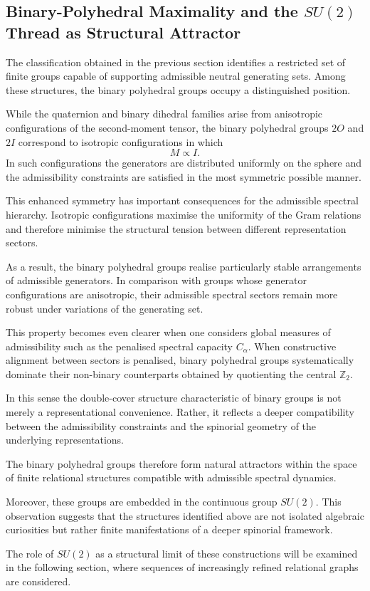 \subsection{Binary-Polyhedral Maximality and the $SU(2)$ Thread as Structural Attractor}
  \label{subsec:binary-polyhedral-maximality}

  The classification obtained in the previous section identifies a restricted
  set of finite groups capable of supporting admissible neutral generating
  sets.
  Among these structures, the binary polyhedral groups occupy a distinguished
  position.

  While the quaternion and binary dihedral families arise from anisotropic
  configurations of the second-moment tensor, the binary polyhedral groups
  $2O$ and $2I$ correspond to isotropic configurations in which
  \[
    M \propto I .
  \]
  In such configurations the generators are distributed uniformly on the
  sphere and the admissibility constraints are satisfied in the most symmetric
  possible manner.

  This enhanced symmetry has important consequences for the admissible
  spectral hierarchy.
  Isotropic configurations maximise the uniformity of the Gram relations and
  therefore minimise the structural tension between different representation
  sectors.

  As a result, the binary polyhedral groups realise particularly stable
  arrangements of admissible generators.
  In comparison with groups whose generator configurations are anisotropic,
  their admissible spectral sectors remain more robust under variations of the
  generating set.

  This property becomes even clearer when one considers global measures of
  admissibility such as the penalised spectral capacity $C_\alpha$.
  When constructive alignment between sectors is penalised, binary polyhedral
  groups systematically dominate their non-binary counterparts obtained by
  quotienting the central $\mathbb{Z}_2$.

  In this sense the double-cover structure characteristic of binary groups is
  not merely a representational convenience.
  Rather, it reflects a deeper compatibility between the admissibility
  constraints and the spinorial geometry of the underlying representations.

  The binary polyhedral groups therefore form natural attractors within the
  space of finite relational structures compatible with admissible spectral
  dynamics.

  Moreover, these groups are embedded in the continuous group $SU(2)$.
  This observation suggests that the structures identified above are not
  isolated algebraic curiosities but rather finite manifestations of a deeper
  spinorial framework.

  The role of $SU(2)$ as a structural limit of these constructions will be
  examined in the following section, where sequences of increasingly refined
  relational graphs are considered.
